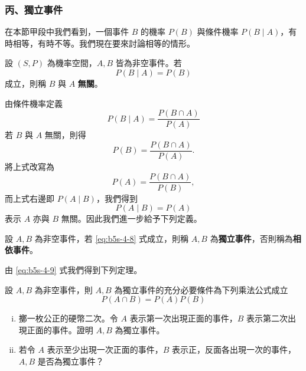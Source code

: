 \subsubsection*{丙、獨立事件}\label{sec:b5s-4-2-c}

在本節甲段中我們看到，一個事件 $B$ 的機率 $P(B)$ 與條件機率 $P(B\mid A)$，有時相等，有時不等。我們現在要來討論相等的情形。

\medskip
\begin{definition*}
設 $(S, P)$ 為機率空間，$A, B$ 皆為非空事件。若
\begin{equation}
P(B\mid A) = P(B) \tag{8}\label{eq:b5s-4-8}
\end{equation}
成立，則稱 $B$ 與 $A$ \textbf{無關}。
\end{definition*}

由條件機率定義
\[
P(B\mid A) = \frac{P(B \cap A)}{P(A)}
\]
若 $B$ 與 $A$ 無關，則得
\begin{equation}
P(B) = \frac{P(B \cap A)}{P(A)}. \tag{9}\label{eq:b5s-4-9}
\end{equation}
將上式改寫為
\[
P(A) = \frac{P(B \cap A)}{P(B)},
\]
而上式右邊即 $P(A\mid B)$，我們得到
\[
P(A\mid B) = P(A)
\]
表示 $A$ 亦與 $B$ 無關。因此我們進一步給予下列定義。

\medskip
\begin{definition*}
設 $A, B$ 為非空事件，若 \eqref{eq:b5s-4-8} 式成立，則稱 $A, B$ 為\textbf{獨立事件}，否則稱為\textbf{相依事件}。
\end{definition*}

由 \eqref{eq:b5s-4-9} 式我們得到下列定理。

\medskip
\begin{theorem}[乘法定理]\label{thm:b5s-4-6}
設 $A, B$ 為非空事件，則 $A, B$ 為獨立事件的充分必要條件為下列乘法公式成立
\begin{equation}
P(A \cap B) = P(A)P(B) \label{eq:b5s-4-10}\tag*{(10)\quad\#}
\end{equation}
\end{theorem}

\medskip
\begin{example}\label{ex:b5s-4-13}
\begin{enumerate}[(i), leftmargin=2.5em, itemsep=0.3em]
  \item 擲一枚公正的硬幣二次。令 $A$ 表示第一次出現正面的事件，$B$ 表示第二次出現正面的事件。證明 $A, B$ 為獨立事件。
  \item 若令 $A$ 表示至少出現一次正面的事件，$B$ 表示正，反面各出現一次的事件，$A, B$ 是否為獨立事件？
\end{enumerate}
\end{example}
